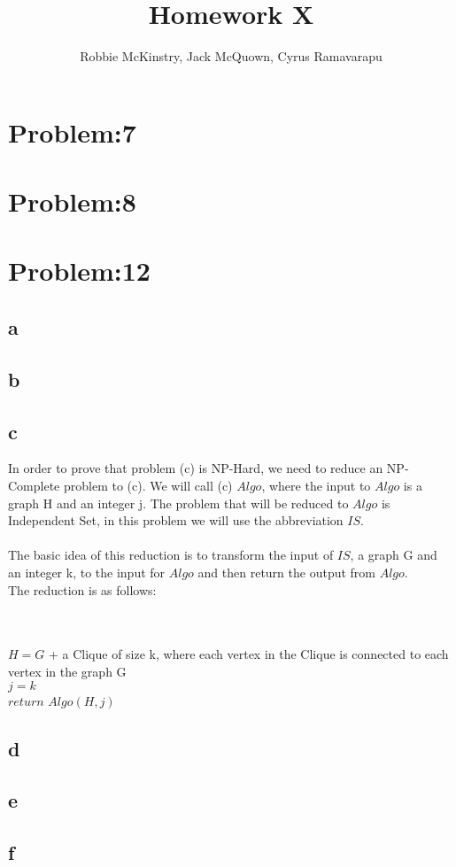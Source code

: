 \documentclass[12pt]{article}
\begin{document}
\title{Homework X}
\author{Robbie McKinstry, Jack McQuown, Cyrus Ramavarapu}
\renewcommand{\today}{7 October 2016}
\renewcommand{\baselinestretch}{1.5}
\maketitle

\section*{Problem:7}
\section*{Problem:8}
\section*{Problem:12}
\subsection*{a}
\subsection*{b}
\subsection*{c}
In order to prove that problem (c) is NP-Hard, we need to reduce an NP-Complete problem to (c). We will call (c) {$Algo$}, where the input to {$Algo$} is a graph H and an integer j. The problem that will be reduced to {$Algo$} is Independent Set, in this problem we will use the abbreviation {$IS$}.\\\\
The basic idea of this reduction is to transform the input of {$IS$}, a graph G and an integer k, to the input for {$Algo$} and then return the output from {$Algo$}.\\
The reduction is as follows: \\\\
\begin{algorithm}[H]
\\
{$H =  G$ + a Clique of size k, where each vertex in the Clique is connected to each vertex in the graph G}\\
{$j = k$}\\
{$return$  $Algo(H, j)$}
\end{algorithm}
\subsection*{d}
\subsection*{e}
\subsection*{f}
\end{document}
